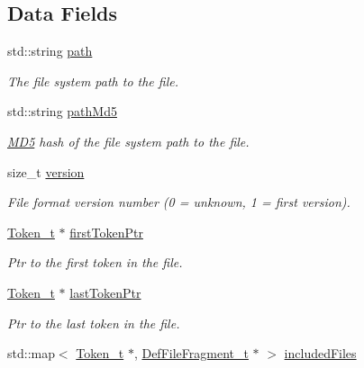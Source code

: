 \subsection*{Data Fields}
\begin{DoxyCompactItemize}
\item 
std\+::string \hyperlink{structparse_tree_1_1_def_file_fragment__t_af38bb92643720eb688ab573d97de2234}{path}
\begin{DoxyCompactList}\small\item\em The file system path to the file. \end{DoxyCompactList}\item 
std\+::string \hyperlink{structparse_tree_1_1_def_file_fragment__t_a4ecda92bd4d75e84634b7be46e0c214a}{path\+Md5}
\begin{DoxyCompactList}\small\item\em \hyperlink{class_m_d5}{M\+D5} hash of the file system path to the file. \end{DoxyCompactList}\item 
size\+\_\+t \hyperlink{structparse_tree_1_1_def_file_fragment__t_a8ca0d54f111d6b0aa5af10e76cacd586}{version}
\begin{DoxyCompactList}\small\item\em File format version number (0 = unknown, 1 = first version). \end{DoxyCompactList}\item 
\hyperlink{structparse_tree_1_1_token__t}{Token\+\_\+t} $\ast$ \hyperlink{structparse_tree_1_1_def_file_fragment__t_afb2d593cfbb3cef8322be908235e0255}{first\+Token\+Ptr}
\begin{DoxyCompactList}\small\item\em Ptr to the first token in the file. \end{DoxyCompactList}\item 
\hyperlink{structparse_tree_1_1_token__t}{Token\+\_\+t} $\ast$ \hyperlink{structparse_tree_1_1_def_file_fragment__t_afe8f97ab2826577f09ce30c62ee34ee2}{last\+Token\+Ptr}
\begin{DoxyCompactList}\small\item\em Ptr to the last token in the file. \end{DoxyCompactList}\item 
std\+::map$<$ \hyperlink{structparse_tree_1_1_token__t}{Token\+\_\+t} $\ast$, \hyperlink{structparse_tree_1_1_def_file_fragment__t}{Def\+File\+Fragment\+\_\+t} $\ast$ $>$ \hyperlink{structparse_tree_1_1_def_file_fragment__t_a0e596aa535a421984a6936d8ae8d1ebf}{included\+Files}
\end{DoxyCompactItemize}


